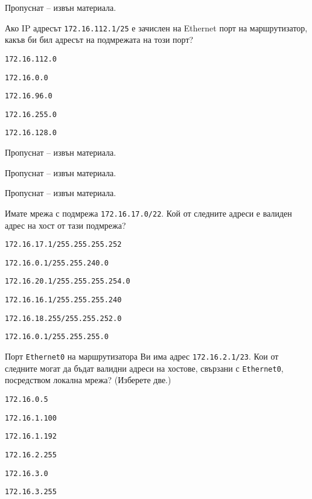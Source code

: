 \begin{q}
  Пропуснат – извън материала.
\end{q}

\begin{q}
  Ако IP адресът \texttt{172.16.112.1/25} е зачислен на Ethernet порт на
  маршрутизатор, какъв би бил адресът на подмрежата на този порт?
  \begin{defractors}
  \item \texttt{172.16.112.0}
  \item \texttt{172.16.0.0}
  \item \texttt{172.16.96.0}
  \item \texttt{172.16.255.0}
  \item \texttt{172.16.128.0}
  \end{defractors}
\end{q}

\begin{q}
  Пропуснат – извън материала.
\end{q}

\begin{q}
  Пропуснат – извън материала.
\end{q}

\begin{q}
  Пропуснат – извън материала.
\end{q}

\begin{q}
  Имате мрежа с подмрежа \texttt{172.16.17.0/22}. Кой от следните адреси е
  валиден адрес на хост от тази подмрежа?
  \begin{defractors}
  \item \texttt{172.16.17.1/255.255.255.252}
  \item \texttt{172.16.0.1/255.255.240.0}
  \item \texttt{172.16.20.1/255.255.255.254.0}
  \item \texttt{172.16.16.1/255.255.255.240}
  \item \texttt{172.16.18.255/255.255.252.0}
  \item \texttt{172.16.0.1/255.255.255.0}
  \end{defractors}
\end{q}

\begin{q}
  Порт \texttt{Ethernet0} на маршрутизатора Ви има адрес
  \texttt{172.16.2.1/23}. Кои от следните могат да бъдат валидни адреси на
  хостове, свързани с \texttt{Ethernet0}, посредством локална мрежа? (Изберете
  две.)
  \begin{defractors}
  \item \texttt{172.16.0.5}
  \item \texttt{172.16.1.100}
  \item \texttt{172.16.1.192}
  \item \texttt{172.16.2.255}
  \item \texttt{172.16.3.0}
  \item \texttt{172.16.3.255}
  \end{defractors}
\end{q}

